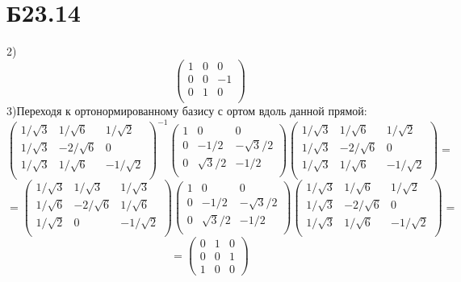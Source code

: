 \documentclass[a4paper,12pt]{article} %
\begin{document}
\section*{Б23.14}
2)$$\begin{pmatrix*}
    1&0&0\\
    0&0&-1\\
    0&1&0\\
\end{pmatrix*}$$
3)Переходя к ортонормированному базису с ортом вдоль данной прямой:
$$\begin{pmatrix*}
    1/\sqrt{3}&1/\sqrt{6}&1/\sqrt{2}\\
    1/\sqrt{3}&-2/\sqrt{6}&0\\
    1/\sqrt{3}&1/\sqrt{6}&-1/\sqrt{2}\\
\end{pmatrix*}^{-1}\begin{pmatrix*}
    1&0&0\\
    0&-1/2&-\sqrt{3}/2\\
    0&\sqrt{3}/2&-1/2\\
\end{pmatrix*}\begin{pmatrix*}
    1/\sqrt{3}&1/\sqrt{6}&1/\sqrt{2}\\
    1/\sqrt{3}&-2/\sqrt{6}&0\\
    1/\sqrt{3}&1/\sqrt{6}&-1/\sqrt{2}\\
\end{pmatrix*}=$$
$$=\begin{pmatrix*}
    1/\sqrt{3}&1/\sqrt{3}&1/\sqrt{3}\\
    1/\sqrt{6}&-2/\sqrt{6}&1/\sqrt{6}\\
    1/\sqrt{2}&0&-1/\sqrt{2}\\
\end{pmatrix*}\begin{pmatrix*}
    1&0&0\\
    0&-1/2&-\sqrt{3}/2\\
    0&\sqrt{3}/2&-1/2\\
\end{pmatrix*}\begin{pmatrix*}
    1/\sqrt{3}&1/\sqrt{6}&1/\sqrt{2}\\
    1/\sqrt{3}&-2/\sqrt{6}&0\\
    1/\sqrt{3}&1/\sqrt{6}&-1/\sqrt{2}\\
\end{pmatrix*}=$$
$$=\begin{pmatrix*}
    0&1&0\\
    0&0&1\\
    1&0&0
\end{pmatrix*}$$
\end{document}
